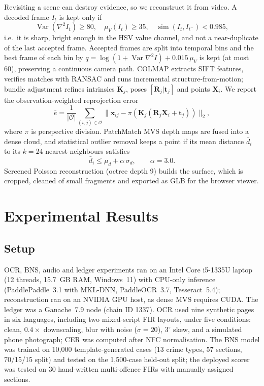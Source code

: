 \documentclass[conference]{IEEEtran}
\begin{document}
Revisiting a scene can destroy evidence, so we reconstruct it from video. A decoded frame $I_t$ is kept only if
\begin{equation}
\operatorname{Var}(\nabla^2I_t)\ge80,\quad \mu_V(I_t)\ge35,\quad \operatorname{sim}(I_t,I_{t^-})<0.985,
\label{eq:keyframe}
\end{equation}
i.e.\ it is sharp, bright enough in the HSV value channel, and not a near-duplicate of the last accepted frame. Accepted frames are split into temporal bins and the best frame of each bin by $q=\log(1+\operatorname{Var}\nabla^2I)+0.015\,\mu_V$ is kept (at most 60), preserving a continuous camera path. COLMAP extracts SIFT features, verifies matches with RANSAC and runs incremental structure-from-motion; bundle adjustment refines intrinsics $\mathbf K_j$, poses $[\mathbf R_j|\mathbf t_j]$ and points $\mathbf X_i$. We report the observation-weighted reprojection error
\begin{equation}
\bar e=\frac{1}{|\mathcal O|}\sum_{(i,j)\in\mathcal O}\bigl\|\mathbf x_{ij}-\pi(\mathbf K_j(\mathbf R_j\mathbf X_i+\mathbf t_j))\bigr\|_2,
\label{eq:reproj}
\end{equation}
where $\pi$ is perspective division. PatchMatch MVS depth maps are fused into a dense cloud, and statistical outlier removal keeps a point if its mean distance $\bar d_i$ to its $k=24$ nearest neighbours satisfies
\begin{equation}
\bar d_i\le\mu_d+\alpha\,\sigma_d,\qquad \alpha=3.0.
\label{eq:sor}
\end{equation}
Screened Poisson reconstruction (octree depth 9) builds the surface, which is cropped, cleaned of small fragments and exported as GLB for the browser viewer.

\section{Experimental Results}
\label{sec:results}

\subsection{Setup}
OCR, BNS, audio and ledger experiments ran on an Intel Core i5-1335U laptop (12 threads, 15.7~GB RAM, Windows~11) with CPU-only inference (PaddlePaddle~3.1 with MKL-DNN, PaddleOCR~3.7, Tesseract~5.4); reconstruction ran on an NVIDIA GPU host, as dense MVS requires CUDA. The ledger was a Ganache~7.9 node (chain ID 1337). OCR used nine synthetic pages in six languages, including two mixed-script FIR layouts, under five conditions: clean, $0.4\times$ downscaling, blur with noise ($\sigma=20$), $3^\circ$ skew, and a simulated phone photograph; CER was computed after NFC normalisation. The BNS model was trained on 10,000 template-generated cases (13 crime types, 57 sections, 70/15/15 split) and tested on the 1,500-case held-out split; the deployed scorer was tested on 30 hand-written multi-offence FIRs with manually assigned sections.
\end{document}
